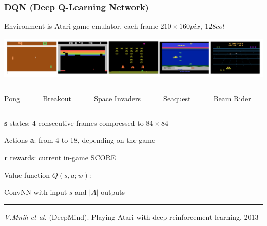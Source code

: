\documentclass[fullscreen=true, bookmarks=true, hyperref={pdfencoding=unicode}]{beamer}
\begin{document}
\begin{frame}
  \frametitle{DQN (Deep Q-Learning Network)}

  Environment is Atari game emulator, each frame $210\times 160pix, \ 128col$
  \begin{center}
     \includegraphics[keepaspectratio,
                      width=.95\paperwidth]{atari_games.png}
  \begin{columns}
      \begin{column}{.15\paperwidth}
      Pong
      \end{column}
      \begin{column}{.15\paperwidth}
      Breakout
      \end{column}
      \begin{column}{.15\paperwidth}
      Space Invaders
      \end{column}
      \begin{column}{.15\paperwidth}
      Seaquest
      \end{column}
      \begin{column}{.15\paperwidth}
      Beam Rider
      \end{column}
  \end{columns}
\end{center}
   
   \pause
   \textbf{s} states: 4 consecutive frames compressed to $84 \times 84$

   Actions \textbf{a}: from 4 to 18, depending on the game

   \textbf{r} rewards: current in-game SCORE

   Value function $Q(s, a; w)$: 

   ConvNN with input $s$ and $|A|$ outputs

  \vspace{0.5cm}
  \noindent\rule{8cm}{0.4pt}

  {\footnotesize
  {\it V.Mnih et al.} (DeepMind). Playing Atari with deep reinforcement learning. 2013}
\end{frame}

\end{document}

